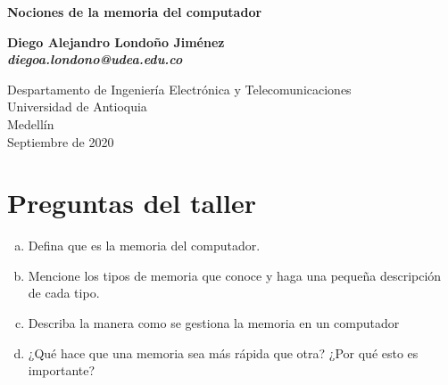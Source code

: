 \documentclass{article}
\begin{document}

\begin{titlepage}
    \begin{center}
        \vspace*{1cm}
            
        \Huge
        \textbf{Nociones de la memoria del computador
}
            
        \vspace{0.5cm}
        \LARGE
            
        \vspace{1.5cm}
            
        \textbf{Diego Alejandro Londoño Jiménez\\ \emph{diegoa.londono@udea.edu.co} }
            
        \vfill
            
        \vspace{0.8cm}
            
        \Large
        Despartamento de Ingeniería Electrónica y Telecomunicaciones\\
        Universidad de Antioquia\\
        Medellín\\
        Septiembre de 2020\\
        
            
    \end{center}
\end{titlepage}






\tableofcontents

\newpage

\section{Preguntas del taller}\label{preguntas}
    \begin{enumerate}[a)]
    \item Defina que es la memoria del computador.
    \item Mencione los tipos de memoria que conoce y haga una pequeña descripción de cada tipo.
    \item Describa la manera como se gestiona la memoria en un computador
    \item ¿Qué hace que una memoria sea más rápida que otra? ¿Por qué esto es importante?
    \end{enumerate}
\end{document}
